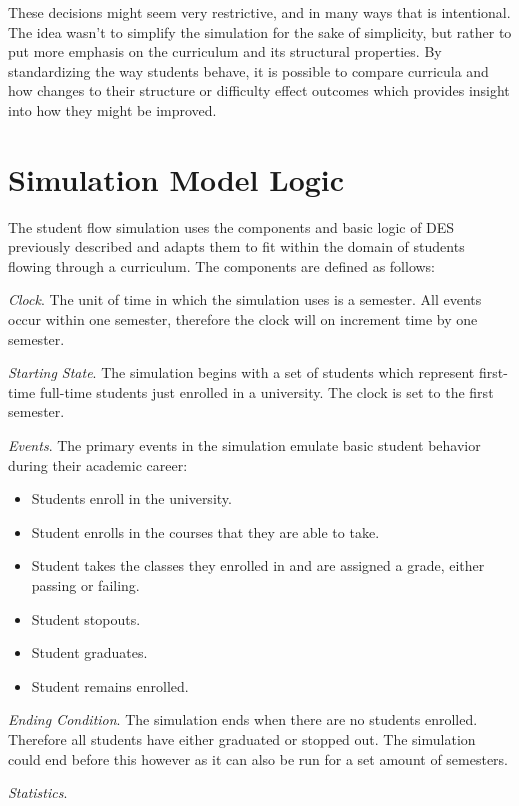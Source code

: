 \documentclass[botnum, fleqn]{unmeethesis}
\begin{document}
  These decisions might seem very restrictive, and in many ways that is intentional. The idea wasn't to simplify the simulation for the sake of simplicity, but rather to put more emphasis on the curriculum and its structural properties. By standardizing the way students behave, it is possible to compare curricula and how changes to their structure or difficulty effect outcomes which provides insight into how they might be improved.

  \section{Simulation Model Logic}
  The student flow simulation uses the components and basic logic of DES previously described and adapts them to fit within the domain of students flowing through a curriculum. The components are defined as follows:

  \textit{Clock}. The unit of time in which the simulation uses is a semester. All events occur within one semester, therefore the clock will on increment time by one semester.

  \textit{Starting State}. The simulation begins with a set of students which represent first-time full-time students just enrolled in a university. The clock is set to the first semester.

  \textit{Events}. The primary events in the simulation emulate basic student behavior during their academic career:
  \begin{itemize}
    \item Students enroll in the university.
    \item Student enrolls in the courses that they are able to take.
    \item Student takes the classes they enrolled in and are assigned a grade, either passing or failing.
    \item Student stopouts.
    \item Student graduates.
    \item Student remains enrolled.
  \end{itemize}

  \textit{Ending Condition}. The simulation ends when there are no students enrolled. Therefore all students have either graduated or stopped out. The simulation could end before this however as it can also be run for a set amount of semesters.

  \textit{Statistics}.
\end{document}
